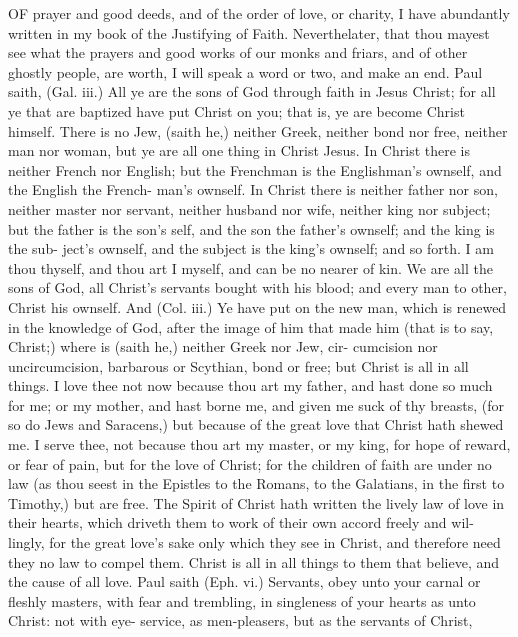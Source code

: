 \documentclass{custom}
\begin{document}
OF prayer and good deeds, and of the order of love, or 
charity, I have abundantly written in my book of the 
Justifying of Faith. Neverthelater, that thou mayest see 
what the prayers and good works of our monks and friars, 
and of other ghostly people, are worth, I will speak a 
word or two, and make an end. Paul saith, (Gal. iii.) 
All ye are the sons of God through faith in Jesus Christ; 
for all ye that are baptized have put Christ on you; that 
is, ye are become Christ himself. There is no Jew, (saith 
he,) neither Greek, neither bond nor free, neither man nor 
woman, but ye are all one thing in Christ Jesus. In Christ 
there is neither French nor English; but the Frenchman 
is the Englishman's ownself, and the English the French- 
man's ownself. In Christ there is neither father nor son, 
neither master nor servant, neither husband nor wife, 
neither king nor subject; but the father is the son's self, 
and the son the father's ownself; and the king is the sub- 
ject's ownself, and the subject is the king's ownself; and 
so forth. I am thou thyself, and thou art I myself, and can 
be no nearer of kin. We are all the sons of God, all 
Christ's servants bought with his blood; and every man 
to other, Christ his ownself. And (Col. iii.) Ye have put 
on the new man, which is renewed in the knowledge of 
God, after the image of him that made him (that is to say, 
Christ;) where is (saith he,) neither Greek nor Jew, cir- 
cumcision nor uncircumcision, barbarous or Scythian, bond 
or free; but Christ is all in all things. I love thee not 
now because thou art my father, and hast done so much 
for me; or my mother, and hast borne me, and given me
suck of thy breasts, (for so do Jews and Saracens,) but 
because of the great love that Christ hath shewed me. I 
serve thee, not because thou art my master, or my king, 
for hope of reward, or fear of pain, but for the love of 
Christ; for the children of faith are under no law (as 
thou seest in the Epistles to the Romans, to the Galatians, 
in the first to Timothy,) but are free. The Spirit of Christ 
hath written the lively law of love in their hearts, which 
driveth them to work of their own accord freely and wil- 
lingly, for the great love's sake only which they see in 
Christ, and therefore need they no law to compel them. 
Christ is all in all things to them that believe, and the cause 
of all love. Paul saith (Eph. vi.) Servants, obey unto 
your carnal or fleshly masters, with fear and trembling, in 
singleness of your hearts as unto Christ: not with eye- 
service, as men-pleasers, but as the servants of Christ, 
\end{document}
